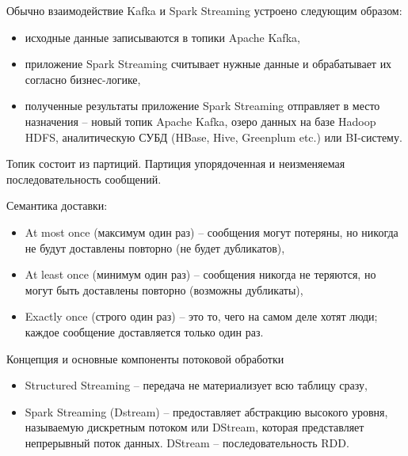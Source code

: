 \documentclass[%
	11pt,
	a4paper,
	utf8,
		]{article}
\begin{document}
Обычно взаимодействие Kafka и Spark Streaming устроено следующим образом:
\begin{itemize}
	\item исходные данные записываются в топики Apache Kafka,
	
	\item приложение Spark Streaming считывает нужные данные и обрабатывает их согласно бизнес-логике,
	
	\item полученные результаты приложение Spark Streaming отправляет в место назначения -- новый топик Apache Kafka, озеро данных на базе Hadoop HDFS, аналитическую СУБД (HBase, Hive, Greenplum etc.) или BI-систему.
\end{itemize}

Топик состоит из партиций. Партиция упорядоченная и неизменяемая последовательность сообщений.

Семантика доставки:
\begin{itemize}
	\item At most once (максимум один раз) -- сообщения могут потеряны, но никогда не будут доставлены повторно (не будет дубликатов),
	
	\item At least once (минимум один раз) -- сообщения никогда не теряются, но могут быть доставлены повторно (возможны дубликаты),
	
	\item Exactly once (строго один раз) -- это то, чего на самом деле хотят люди; каждое сообщение доставляется только один раз.
\end{itemize}

Концепция и основные компоненты потоковой обработки
\begin{itemize}
	\item Structured Streaming -- передача не материализует всю таблицу сразу,
	
	\item Spark Streaming (Dstream) -- предоставляет абстракцию высокого уровня, называемую дискретным потоком или DStream, которая представляет непрерывный поток данных. DStream -- последовательность RDD.
\end{itemize}
\end{document}
